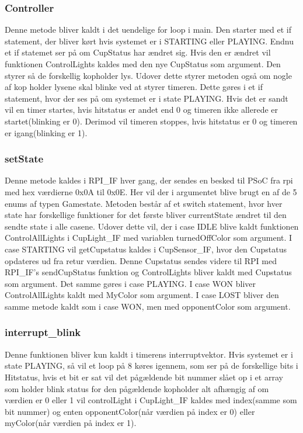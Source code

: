 \documentclass[Softwaredesign/Softwaredesign_main.tex]{subfiles}
\begin{document}
\subsubsection{Controller}
Denne metode bliver kaldt i det uendelige for loop i main. Den starter med et if statement, der bliver kørt hvis systemet er i STARTING eller PLAYING. Endnu et if statemet ser på om CupStatus har ændret sig. Hvis den er ændret vil funktionen ControlLights kaldes med den nye CupStatus som argument. Den styrer så de forskellig kopholder lys. Udover dette styrer metoden også om nogle af kop holder lysene skal blinke ved at styrer timeren. Dette gøres i et if statement, hvor der ses på om systemet er i state PLAYING. Hvis det er sandt vil en timer startes, hvis hitstatus er andet end 0 og timeren ikke allerede er startet(blinking er 0). Derimod vil timeren stoppes, hvis hitstatus er 0 og timeren er igang(blinking er 1).
\subsubsection{setState}
Denne metode kaldes i RPI\_IF hver gang, der sendes en besked til PSoC fra rpi med hex værdierne 0x0A til 0x0E. Her vil der i argumentet blive brugt en af de 5 enums af typen Gamestate. Metoden består af et switch statement, hvor hver state har forskellige funktioner for det første bliver currentState ændret til den sendte state i alle casene. Udover dette vil, der i case IDLE blive kaldt funktionen ControlAllLights i CupLight\_IF med variablen turnedOffColor som argument. I case STARTING vil getCupstatus kaldes i CupSensor\_IF, hvor den Cupstatus opdateres ud fra retur værdien. Denne Cupstatus sendes videre til RPI med RPI\_IF's sendCupStatus funktion og ControlLights bliver kaldt med Cupstatus som argument. Det samme gøres i case PLAYING. I case WON bliver ControlAllLights kaldt med MyColor som argument. I case LOST bliver den samme metode kaldt som i case WON, men med opponentColor som argument.
\subsubsection{interrupt\_blink}
Denne funktionen bliver kun kaldt i timerens interruptvektor. Hvis systemet er i state PLAYING, så vil et loop på 8 køres igennem, som ser på de forskellige bits i Hitstatus, hvis et bit er sat vil det pågældende bit nummer slået op i et array som holder blink status for den pågældende kopholder alt afhængig af om værdien er 0 eller 1 vil controlLight i CupLight\_IF kaldes med index(samme som bit nummer) og enten opponentColor(når værdien på index er 0) eller myColor(når værdien på index er 1).
\end{document}
